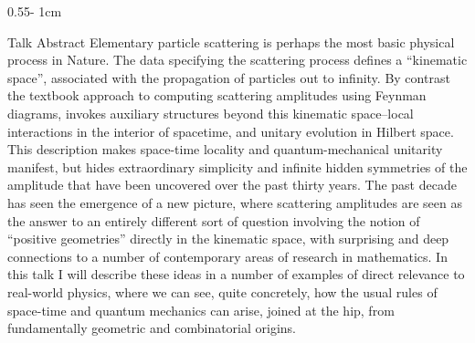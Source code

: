\documentclass{psuposter}
\begin{document}
\begin{frame}
\begin{columns}[onlytextwidth]
\begin{column}{0.55\textwidth - 1cm}
    \begin{block}{Talk Abstract}
        Elementary particle scattering is perhaps the most basic physical process in Nature. The data specifying the scattering process defines a ``kinematic space'', associated with the propagation of particles out to infinity. By contrast the textbook approach to computing scattering amplitudes using Feynman diagrams, invokes auxiliary structures beyond this kinematic space--local interactions in the interior of spacetime, and unitary evolution in Hilbert space. This description makes space-time locality and quantum-mechanical unitarity manifest, but hides extraordinary simplicity and infinite hidden symmetries of the amplitude that have been uncovered over the past thirty years. The past decade has seen the emergence of a new picture, where scattering amplitudes are seen as the answer to an entirely different sort of question involving  the notion of ``positive geometries'' directly in the kinematic space, with surprising and deep connections to a number of contemporary areas of research in mathematics. In this talk I will describe these ideas in a number of examples of direct relevance to real-world physics, where we can see, quite concretely, how the usual rules of space-time and quantum mechanics can arise, joined at the hip, from fundamentally geometric and combinatorial origins.
    \end{block}


\end{column}
\end{columns}
\end{frame}
\end{document}
